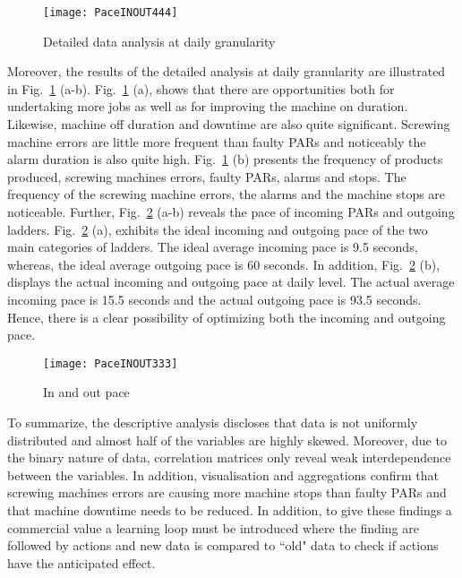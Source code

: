 \documentclass[runningheads]{llncs}
\begin{document}
\begin{figure}
\centering
\texttt{[image: PaceINOUT444]} 
\caption{Detailed data analysis at daily granularity \cite{nadeem}}
\label{fig:detailedanalysis}
\end{figure}

Moreover, the results of the detailed analysis at daily granularity are illustrated in Fig.~\ref{fig:detailedanalysis} (a-b). Fig.~\ref{fig:detailedanalysis} (a), shows that there are opportunities both for undertaking more jobs as well as for improving the machine on duration. Likewise, machine off duration and downtime are also quite significant. Screwing machine errors are little more frequent than faulty PARs and noticeably the alarm duration is also quite high. Fig.~\ref{fig:detailedanalysis} (b) presents the frequency of products produced, screwing machines errors, faulty PARs, alarms and stops. The frequency of the screwing machine errors, the alarms and the machine stops are noticeable. Further, Fig.~\ref{fig:pace} (a-b) reveals the pace of  incoming PARs and outgoing ladders. Fig.~\ref{fig:pace} (a), exhibits the ideal incoming and outgoing pace of the two main categories of ladders. The ideal average incoming pace is 9.5 seconds, whereas, the ideal average outgoing pace is 60 seconds. In addition, Fig.~\ref{fig:pace} (b), displays the actual incoming and outgoing pace at daily level. The actual average incoming pace is 15.5 seconds and the actual outgoing pace is 93.5 seconds. Hence, there is a clear possibility of optimizing both the incoming and outgoing pace.

\begin{figure}
\centering
\texttt{[image: PaceINOUT333]} 
\caption{In and out pace}
\label{fig:pace}
\end{figure}

To summarize, the descriptive analysis discloses that data is not uniformly distributed and almost half of the variables are highly skewed. Moreover, due to the binary nature of data, correlation matrices only reveal weak interdependence between the variables. In addition, visualisation and aggregations confirm that screwing machines errors are causing more machine stops than faulty PARs and that machine downtime needs to be reduced. In addition, to give these findings a commercial value a learning loop must be introduced where the finding are followed by actions and new data is compared to ``old" data to check if actions have the anticipated effect.
  
\end{document}

